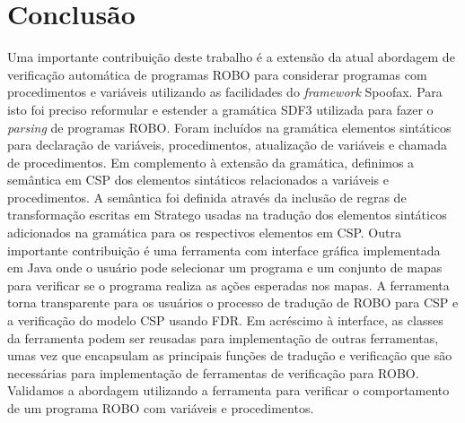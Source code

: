 \chapter{Conclusão}
\label{chap:cap5}

Uma importante contribuição deste trabalho é a extensão da atual abordagem de verificação automática de programas ROBO para considerar programas com procedimentos e variáveis utilizando as facilidades do \textit{framework} Spoofax. Para isto foi preciso reformular e estender a gramática SDF3 utilizada para fazer o \textit{parsing} de programas ROBO. Foram incluídos na gramática elementos sintáticos para declaração de variáveis, procedimentos, atualização de variáveis e chamada de procedimentos. Em complemento à extensão da gramática, definimos a semântica em CSP dos elementos sintáticos relacionados a variáveis e procedimentos. A semântica foi definida através da inclusão de regras de transformação escritas em Stratego usadas na tradução dos elementos sintáticos adicionados na gramática para os respectivos elementos em CSP. Outra importante contribuição é uma ferramenta com interface gráfica implementada em Java onde o usuário pode selecionar um programa e um conjunto de mapas para verificar se o programa realiza as ações esperadas nos mapas. A ferramenta torna transparente para os usuários o processo de tradução de ROBO para CSP e a verificação do modelo CSP usando FDR. Em acréscimo à interface, as classes da ferramenta podem ser reusadas para implementação de outras ferramentas, umas vez que encapsulam as principais funções de tradução e verificação que são necessárias para implementação de ferramentas de verificação para ROBO. Validamos a abordagem utilizando a ferramenta para verificar o comportamento de um programa ROBO com variáveis e procedimentos. 


